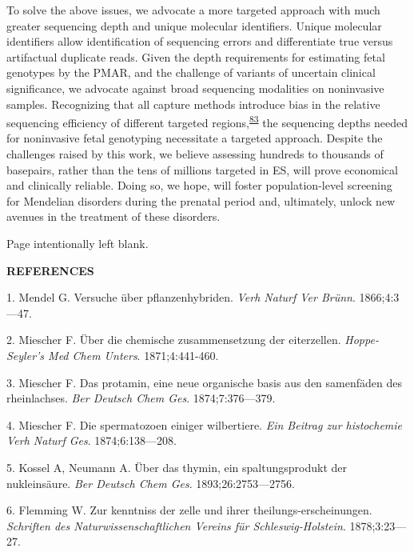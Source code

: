 \documentclass[11pt,letterpaper]{book}
\makeatletter
\newcommand*{\blankpage}{%
\vspace*{\fill}
{\centering Page intentionally left blank. \par}
\vspace{\fill}}
\renewcommand*{\cleardoublepage}{\clearpage\if@twoside \ifodd\c@page\else
\blankpage
\thispagestyle{empty}
\newpage
\if@twocolumn\hbox{}\newpage\fi\fi\fi}
\newcommand{\myonein}[1]{
\begin{center}
\bfseries\Large\MakeUppercase{#1}
\end{center}
}
\makeatother
\begin{document}
To solve the above issues, we advocate a more targeted approach with much greater sequencing depth and unique molecular identifiers.
Unique molecular identifiers allow identification of sequencing errors and differentiate true versus artifactual duplicate reads.
Given the depth requirements for estimating fetal genotypes by the PMAR, and the challenge of variants of uncertain clinical significance, we advocate against broad sequencing modalities on noninvasive samples.
Recognizing that all capture methods introduce bias in the relative sequencing efficiency of different targeted regions,\textsuperscript{\protect\hyperlink{ref-seaby:2016aa}{83}} the sequencing depths needed for noninvasive fetal genotyping necessitate a targeted approach.
Despite the challenges raised by this work, we believe assessing hundreds to thousands of basepairs, rather than the tens of millions targeted in ES, will prove economical and clinically reliable.
Doing so, we hope, will foster population-level screening for Mendelian disorders during the prenatal period and, ultimately, unlock new avenues in the treatment of these disorders.

\backmatter

\setlength{\parindent}{0ex}
\cleardoublepage
{}
{}
\myonein{REFERENCES}

\hypertarget{refs}{}
\leavevmode\hypertarget{ref-mendel:1866aa}{}%
1. Mendel G. Versuche über pflanzenhybriden. \emph{Verh Naturf Ver Brünn}. 1866;4:3---47.

\leavevmode\hypertarget{ref-miescher:1871aa}{}%
2. Miescher F. Über die chemische zusammensetzung der eiterzellen. \emph{Hoppe-Seyler's Med Chem Unters}. 1871;4:441-460.

\leavevmode\hypertarget{ref-miescher:1874aa}{}%
3. Miescher F. Das protamin, eine neue organische basis aus den samenfäden des rheinlachses. \emph{Ber Deutsch Chem Ges}. 1874;7:376---379.

\leavevmode\hypertarget{ref-miescher:1874ab}{}%
4. Miescher F. Die spermatozoen einiger wilbertiere. \emph{Ein Beitrag zur histochemie Verh Naturf Ges}. 1874;6:138---208.

\leavevmode\hypertarget{ref-kossel:1893aa}{}%
5. Kossel A, Neumann A. Über das thymin, ein spaltungsprodukt der nukleinsäure. \emph{Ber Deutsch Chem Ges}. 1893;26:2753---2756.

\leavevmode\hypertarget{ref-flemming:1878aa}{}%
6. Flemming W. Zur kenntniss der zelle und ihrer theilungs-erscheinungen. \emph{Schriften des Naturwissenschaftlichen Vereins für Schleswig-Holstein}. 1878;3:23---27.
\end{document}
